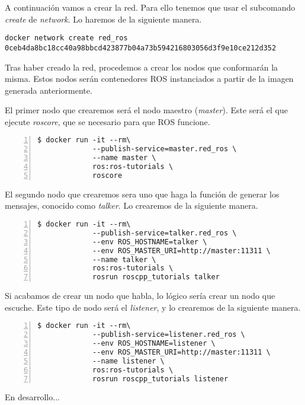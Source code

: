 {	A continuación vamos a crear la red. Para ello tenemos que usar el subcomando \emph{create} de \emph{network}. Lo haremos de la siguiente manera.

	\begin{lstlisting}[style=consola]
docker network create red_ros
0ceb4da8bc18cc40a98bbcd423877b04a73b594216803056d3f9e10ce212d352
	\end{lstlisting}
	
	Tras haber creado la red, procedemos a crear los nodos que conformarán la misma. Estos nodos serán contenedores ROS instanciados a partir de la imagen generada anteriormente.

	El primer nodo que crearemos será el nodo maestro (\emph{master}). Este será el que ejecute \emph{roscore}, que se necesario para que ROS funcione.

	\begin{lstlisting}[style=consola,numbers=left]
$ docker run -it --rm\
             --publish-service=master.red_ros \
             --name master \
             ros:ros-tutorials \
             roscore
	\end{lstlisting}
	

	El segundo nodo que crearemos sera uno que haga la función de generar los mensajes, conocido como \emph{talker}. Lo crearemos de la siguiente manera.
		
	\begin{lstlisting}[style=consola,numbers=left]
$ docker run -it --rm\
             --publish-service=talker.red_ros \
             --env ROS_HOSTNAME=talker \
             --env ROS_MASTER_URI=http://master:11311 \
             --name talker \
             ros:ros-tutorials \
             rosrun roscpp_tutorials talker
	\end{lstlisting}
	

	Si acabamos de crear un nodo que habla, lo lógico sería crear un nodo que escuche. Este tipo de nodo será el \emph{listener}, y lo crearemos de la siguiente manera.

	\begin{lstlisting}[style=consola,numbers=left]
$ docker run -it --rm\
             --publish-service=listener.red_ros \
             --env ROS_HOSTNAME=listener \
             --env ROS_MASTER_URI=http://master:11311 \
             --name listener \
             ros:ros-tutorials \
             rosrun roscpp_tutorials listener
	\end{lstlisting}
	
	En desarrollo...
}

